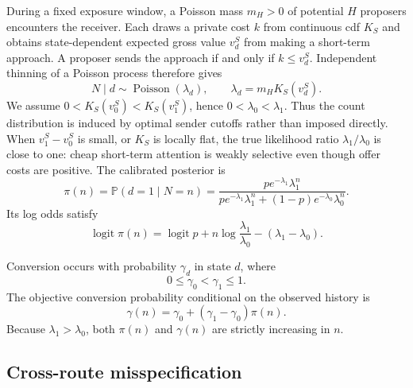 \documentclass[11pt]{article}
\newcommand{\Prob}{\mathbb{P}}
\newcommand{\logit}{\operatorname{logit}}
\newcommand{\Pois}{\operatorname{Poisson}}
\begin{document}
During a fixed exposure window, a Poisson mass $m_H>0$ of potential $H$
proposers encounters the receiver. Each draws a private cost $k$ from continuous
cdf $K_S$ and obtains state-dependent expected gross value $v_d^S$ from making
a short-term approach. A proposer sends the approach if and only if
$k\leq v_d^S$. Independent thinning of a Poisson process therefore gives
\begin{equation}
N\mid d\sim\Pois(\lambda_d),\qquad
\lambda_d=m_HK_S(v_d^S). \label{eq:true-poisson}
\end{equation}
We assume $0<K_S(v_0^S)<K_S(v_1^S)$, hence
$0<\lambda_0<\lambda_1$. Thus the count distribution is induced by optimal
sender cutoffs rather than imposed directly. When $v_1^S-v_0^S$ is small, or
$K_S$ is locally flat, the true likelihood ratio $\lambda_1/\lambda_0$ is close
to one: cheap short-term attention is weakly selective even though offer costs
are positive.
The calibrated posterior is
\begin{equation}
\pi(n)
=\Prob(d=1\mid N=n)
=\frac{p e^{-\lambda_1}\lambda_1^n}
{p e^{-\lambda_1}\lambda_1^n+(1-p)e^{-\lambda_0}\lambda_0^n}. \label{eq:true-posterior}
\end{equation}
Its log odds satisfy
\begin{equation}
\logit\pi(n)
=\logit p+n\log\frac{\lambda_1}{\lambda_0}
-(\lambda_1-\lambda_0). \label{eq:true-logodds}
\end{equation}

Conversion occurs with probability $\gamma_d$ in state $d$, where
\begin{equation}
0\leq\gamma_0<\gamma_1\leq1. \label{eq:gammas}
\end{equation}
The objective conversion probability conditional on the observed history is
\begin{equation}
\gamma(n)=\gamma_0+(\gamma_1-\gamma_0)\pi(n). \label{eq:true-gamma}
\end{equation}
Because $\lambda_1>\lambda_0$, both $\pi(n)$ and $\gamma(n)$ are strictly
increasing in $n$.

\subsection{Cross-route misspecification}
\end{document}
